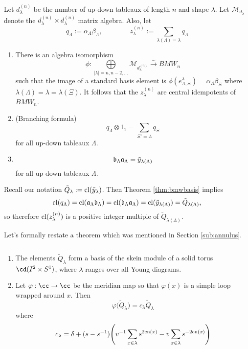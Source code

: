 \begin{theorem}[\AP{BB01}, Section 5] \label{thm:bmwbasis}
Let $d_\lambda^{(n)}$ be the number of up-down tableaux of length $n$ and shape $\lambda$. 
Let $\mathcal{M}_{d_\lambda}$ denote the $d_\lambda^{(n)} \times d_\lambda^{(n)}$ matrix algebra. 
Also, let
\[
    q_\Lambda := \alpha_\Lambda \beta_\Lambda, \qquad \qquad z_\lambda^{(n)}:= \sum_{\lambda(\Lambda)=\lambda} q_\Lambda
\]

\begin{enumerate} 
\item There is an algebra isomorphism
\[
    \phi: \underset{|\lambda| = n, n-2, \dots}{\bigoplus} \mathcal{M}_{d_{\lambda}^{(n)}} \overset{\sim}{\longrightarrow} BMW_n
\]
such that the image of a standard basis element is $\phi( e_{\Lambda,\Xi}^\lambda) = \alpha_\Lambda \beta_\Xi$ where $\lambda(\Lambda) = \lambda = \lambda(\Xi)$.
It follows that the $z_\lambda^{(n)}$ are central idempotents of $BMW_n$. \\
\item (Branching formula)
\[
    q_\Lambda \otimes 1_1 = \sum_{\Xi'=\Lambda} q_\Xi
\] 
for all up-down tableaux $\Lambda$.
\item 
\[
    \mathfrak{b}_\Lambda \mathfrak{a}_\Lambda = \tilde{y}_{\lambda(\Lambda)}
\]
for all up-down tableaux $\Lambda$.
\end{enumerate}
\end{theorem}

\begin{remark} \label{rmk:qclosure}
Recall our notation $\tilde{Q}_\lambda := \mathrm{cl}(\tilde{y}_\lambda)$. Then Theorem \ref{thm:bmwbasis} implies
\[
    \mathrm{cl}(q_\Lambda) = \mathrm{cl}(\mathfrak{a}_\Lambda \mathfrak{b}_\Lambda) = \mathrm{cl}(\mathfrak{b}_\Lambda \mathfrak{a}_\Lambda) = \mathrm{cl}(\tilde{y}_{\lambda(\Lambda)}) = \tilde{Q}_{\lambda(\Lambda)},
\]
so therefore $\mathrm{cl}(z_\lambda^{(n)})$ is a positive integer multiple of $\tilde{Q}_{\lambda(\Lambda)}$.
\end{remark}

Let's formally restate a theorem which was mentioned in Section \ref{sub:annulus}.

\begin{theorem}\label{thm:ann_basis} 
$\,$
\begin{enumerate}
    \item The elements $\tilde{Q}_\lambda$ form a basis of the skein module of a solid torus $\cd(I^2 \times S^1)$, where $\lambda$ ranges over all Young diagrams. 
    \item Let $\varphi: \cc \to \cc$ be the meridian map so that $\varphi(x)$ is a simple loop wrapped around $x$. Then
    \[
        \varphi \big( \tilde{Q}_\lambda \big) = c_\lambda \tilde{Q}_\lambda
    \]
    where 
        \[c_\lambda = \delta + (s - s^{-1}) \Bigg( v^{-1}\sum_{x \in \lambda} s^{2\mathrm{cn}(x)} - v\sum_{x \in \lambda} s^{-2\mathrm{cn}(x)} \Bigg)
    \]
\end{enumerate}
\end{theorem}

